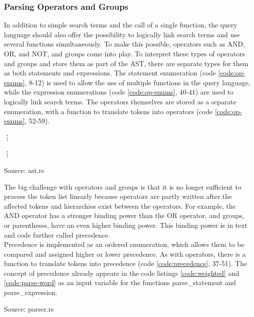 \subsubsection{Parsing Operators and Groups}\label{sec:operators}
In addition to simple search terms and the call of a single function, the query language should also offer the possibility to logically link search terms and use several functions simultaneously. To make this possible, operators such as AND, OR, and NOT, and groups come into play. To interpret these types of operators and groups and store them as part of the \ac{AST}, there are separate types for them as both statements and expressions. The statement enumeration (code \ref{code:op-enums}, 8-12) is used to allow the use of multiple functions in the query language, while the expression enumerations (code \ref{code:op-enums}, 40-41) are used to logically link search terms. The operators themselves are stored as a separate enumeration, with a function to translate tokens into operators (code \ref{code:op-enums}, 52-59).
\begin{codeenv}
    \label{code:op-enums}
    
    \vdots
    
    \vdots
    
    \centerline{Source: ast.rs}
\end{codeenv}
The big challenge with operators and groups is that it is no longer sufficient to process the token list linearly because operators are partly written after the affected tokens and hierarchies exist between the operators. For example, the AND operator has a stronger binding power than the OR operator, and groups, or parentheses, have an even higher binding power. This binding power is in text and code further called precedence.\\
Precedence is implemented as an ordered enumeration, which allows them to be compared and assigned higher or lower precedence. As with operators, there is a function to translate tokens into precedence (code \ref{code:precedence}, 37-51). The concept of precedence already appears in the code listings \ref{code:weighted} and \ref{code:parse-word} as an input variable for the functions parse\_statement and parse\_expression.
\begin{codeenv}
    \label{code:precedence}
    
    \centerline{Source: parser.rs}
\end{codeenv}

